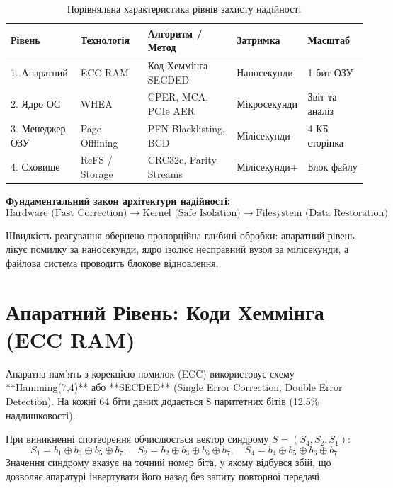 \documentclass[12pt,a4paper]{article}
\begin{document}
\begin{table}[h!]
\centering
\caption{Порівняльна характеристика рівнів захисту надійності}
\label{tab:levels}
\begin{tabular}{@{}lllll@{}}
\toprule
\textbf{Рівень} & \textbf{Технологія} & \textbf{Алгоритм / Метод} & \textbf{Затримка} & \textbf{Масштаб} \\ \midrule
1. Апаратний & ECC RAM & Код Хеммінга SECDED & Наносекунди & 1 бит ОЗУ \\
2. Ядро ОС & WHEA & CPER, MCA, PCIe AER & Мікросекунди & Звіт та аналіз \\
3. Менеджер ОЗУ & Page Offlining & PFN Blacklisting, BCD & Мілісекунди & 4 КБ сторінка \\
4. Сховище & ReFS / Storage & CRC32c, Parity Streams & Мілісекунди+ & Блок файлу \\ \bottomrule
\end{tabular}
\end{table}

\textbf{Фундаментальний закон архітектури надійності:}
\begin{equation}
\text{Hardware (Fast Correction)} \longrightarrow \text{Kernel (Safe Isolation)} \longrightarrow \text{Filesystem (Data Restoration)}
\end{equation}

Швидкість реагування обернено пропорційна глибині обробки: апаратний рівень лікує помилку за наносекунди, ядро ізолює несправний вузол за мілісекунди, а файлова система проводить блокове відновлення.

\section{Апаратний Рівень: Коди Хеммінга (ECC RAM)}
Апаратна пам'ять з корекцією помилок (ECC) використовує схему **Hamming(7,4)** або **SECDED** (Single Error Correction, Double Error Detection). На кожні 64 біти даних додається 8 паритетних бітів (12.5\% надлишковості).

При виникненні спотворення обчислюється вектор синдрому $S = (S_4, S_2, S_1)$:
\begin{equation}
S_1 = b_1 \oplus b_3 \oplus b_5 \oplus b_7, \quad
S_2 = b_2 \oplus b_3 \oplus b_6 \oplus b_7, \quad
S_4 = b_4 \oplus b_5 \oplus b_6 \oplus b_7
\end{equation}
Значення синдрому вказує на точний номер біта, у якому відбувся збій, що дозволяє апаратурі інвертувати його назад без запиту повторної передачі.
\end{document}
